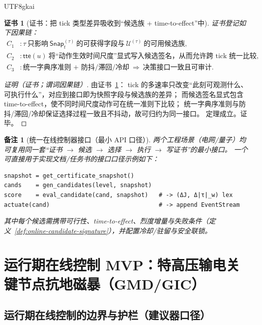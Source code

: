 \documentclass[12pt]{article}
\newtheorem{remark}{备注}[section]
\newtheorem{Certificate}{证书}[section]
\begin{document}
\begin{CJK*}{UTF8}{gkai}
\begin{Certificate}[证书：把 tick 类型差异吸收到“候选族 + time-to-effect”中]
\label{cert:online-multi-rate-unified-interface}
证书登记如下因果链：
\[
\begin{aligned}
  C_1 &: \tau\ \text{只影响}\ \mathsf{Snap}_{t}^{(\tau)}\ \text{的可获得字段与}\ \mathcal{U}^{(\tau)}\ \text{的可用候选族},\\
  C_2 &: \mathsf{tte}(u)\ \text{将“动作生效时间尺度”显式写入候选签名，从而允许跨 tick 统一比较},\\
  C_3 &: \text{统一字典序准则 + 防抖/滞回/冷却}\ \Rightarrow\ \text{决策接口一致且可审计}.
\end{aligned}
\]
\end{Certificate}

\begin{proof}[证明（证书；谓词因果链）]
由证书~\ref{cert:online-multi-rate-unified-interface}：
tick 的多速率只改变“此刻可观测什么、可执行什么”，对应到接口即为快照字段与候选族的差异；
而候选签名显式包含 time-to-effect，使不同时间尺度动作可在统一准则下比较；
统一字典序准则与防抖/滞回/冷却保证选择过程一致且不抖动，故可归约为同一接口。
定理成立。证毕。
\end{proof}

\begin{remark}[统一在线控制器接口（最小 API 口径）]
两个工程场景（电网/量子）均可复用同一套“证书 $\to$ 候选 $\to$ 选择 $\to$ 执行 $\to$ 写证书”的最小接口。
一个可直接用于实现文档/任务书的接口口径示例如下：
\begin{verbatim}
snapshot = get_certificate_snapshot()
cands    = gen_candidates(level, snapshot)
score    = eval_candidate(cand, snapshot)   # -> (ΔJ, Δ|τ|_w) lex
actuate(cand)                               # -> append EventStream
\end{verbatim}
其中每个候选需携带可行性、time-to-effect、烈度增量与失败条件（定义~\ref{def:online-candidate-signature}），并配置冷却/驻留与安全联锁。
\end{remark}

\section{运行期在线控制 MVP：特高压输电关键节点抗地磁暴（GMD/GIC）}
\label{sec:online-grid-gmd-mvp}

\subsection{运行期在线控制的边界与护栏（建议器口径）}
\label{sec:online-grid-boundary-guards}


\end{CJK*}
\end{document}
